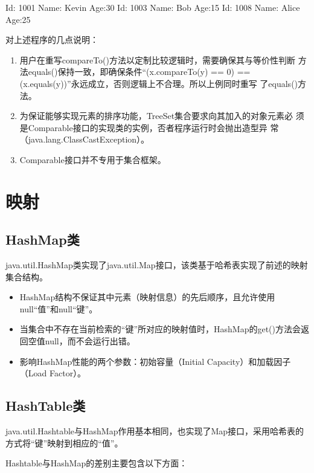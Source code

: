\begin{stdoutCode}
  Id: 1001 Name: Kevin Age:30
  Id: 1003 Name: Bob Age:15
  Id: 1008 Name: Alice Age:25
\end{stdoutCode}

对上述程序的几点说明：

\begin{enumerate}
\item 用户在重写compareTo()方法以定制比较逻辑时，需要确保其与等价性判断
  方法equals()保持一致，即确保条件“{\Red (x.compareTo(y) == 0) ==
    (x.equals(y))}”永远成立，否则逻辑上不合理。所以上例同时重写
  了equals()方法。
\item 为保证能够实现元素的排序功能，TreeSet集合要求向其加入的对象元素必
  须是Comparable接口的实现类的实例，否者程序运行时会抛出{\Red 造型异
    常}（java.lang.ClassCastException）。
\item Comparable接口并不专用于集合框架。
\end{enumerate}

\section{映射}

\subsection{HashMap类}

java.util.HashMap类实现了java.util.Map接口，该类基于{\hei\Blue 哈希表}实现了前述的映射集合结构。

\begin{itemize}
\item HashMap结构不保证其中元素（映射信息）的先后顺序，且允许使用null“值”和null“键”。
\item 当集合中不存在当前检索的“键”所对应的映射值时，HashMap的get()方法会返回空值null，而不会运行出错。
\item 影响HashMap性能的两个参数：初始容量（Initial Capacity）和加载因子（Load Factor）。
\end{itemize}

\subsection{HashTable类}

java.util.Hashtable与HashMap作用基本相同，也实现了Map接口，采用哈希表的方式将“键”映射到相应的“值”。

Hashtable与HashMap的差别主要包含以下方面：

